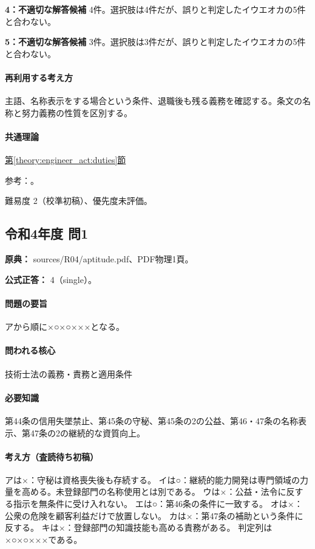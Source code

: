\noindent\textbf{4：不適切な解答候補} 4件。選択肢は4件だが、誤りと判定したイウエオカの5件と合わない。\par

\noindent\textbf{5：不適切な解答候補} 3件。選択肢は3件だが、誤りと判定したイウエオカの5件と合わない。\par

\paragraph{再利用する考え方} 主語、名称表示をする場合という条件、退職後も残る義務を確認する。条文の名称と努力義務の性質を区別する。

\paragraph{共通理論} \hyperref[theory:engineer_act:duties]{第\ref*{theory:engineer_act:duties}節}

\par 参考：\cite{engineer_act_current}。

\par 難易度 2（校準初稿）、優先度未評価。

\subsection{令和4年度 問1}
\label{q:r04-reg-apt-01}

\noindent\textbf{原典：} sources/R04/aptitude.pdf、PDF物理1頁。

\textbf{公式正答：} 4（single）。

\paragraph{問題の要旨} アから順に×○×○×××となる。

\paragraph{問われる核心} 技術士法の義務・責務と適用条件

\paragraph{必要知識} 第44条の信用失墜禁止、第45条の守秘、第45条の2の公益、第46・47条の名称表示、第47条の2の継続的な資質向上。

\paragraph{考え方（査読待ち初稿）} アは×：守秘は資格喪失後も存続する。 イは○：継続的能力開発は専門領域の力量を高める。未登録部門の名称使用とは別である。 ウは×：公益・法令に反する指示を無条件に受け入れない。 エは○：第46条の条件に一致する。 オは×：公衆の危険を顧客利益だけで放置しない。 カは×：第47条の補助という条件に反する。 キは×：登録部門の知識技能も高める責務がある。 判定列は×○×○×××である。

